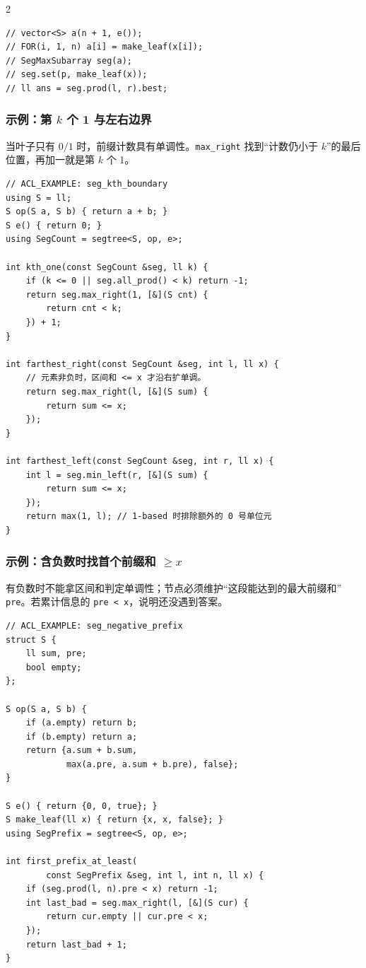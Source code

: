 \begin{multicols*}{2}
\begin{verbatim}
// vector<S> a(n + 1, e());
// FOR(i, 1, n) a[i] = make_leaf(x[i]);
// SegMaxSubarray seg(a);
// seg.set(p, make_leaf(x));
// ll ans = seg.prod(l, r).best;
			\end{verbatim}

			\subsubsection{示例：第 $k$ 个 1 与左右边界}

			当叶子只有 $0/1$ 时，前缀计数具有单调性。\texttt{max\_right} 找到“计数仍小于 $k$”的最后位置，再加一就是第 $k$ 个 1。

			\begin{verbatim}
// ACL_EXAMPLE: seg_kth_boundary
using S = ll;
S op(S a, S b) { return a + b; }
S e() { return 0; }
using SegCount = segtree<S, op, e>;

int kth_one(const SegCount &seg, ll k) {
    if (k <= 0 || seg.all_prod() < k) return -1;
    return seg.max_right(1, [&](S cnt) {
        return cnt < k;
    }) + 1;
}

int farthest_right(const SegCount &seg, int l, ll x) {
    // 元素非负时，区间和 <= x 才沿右扩单调。
    return seg.max_right(l, [&](S sum) {
        return sum <= x;
    });
}

int farthest_left(const SegCount &seg, int r, ll x) {
    int l = seg.min_left(r, [&](S sum) {
        return sum <= x;
    });
    return max(1, l); // 1-based 时排除额外的 0 号单位元
}
			\end{verbatim}

			\subsubsection{示例：含负数时找首个前缀和 $\ge x$}

			有负数时不能拿区间和判定单调性；节点必须维护“这段能达到的最大前缀和” \texttt{pre}。若累计信息的 \texttt{pre < x}，说明还没遇到答案。

			\begin{verbatim}
// ACL_EXAMPLE: seg_negative_prefix
struct S {
    ll sum, pre;
    bool empty;
};

S op(S a, S b) {
    if (a.empty) return b;
    if (b.empty) return a;
    return {a.sum + b.sum,
            max(a.pre, a.sum + b.pre), false};
}

S e() { return {0, 0, true}; }
S make_leaf(ll x) { return {x, x, false}; }
using SegPrefix = segtree<S, op, e>;

int first_prefix_at_least(
        const SegPrefix &seg, int l, int n, ll x) {
    if (seg.prod(l, n).pre < x) return -1;
    int last_bad = seg.max_right(l, [&](S cur) {
        return cur.empty || cur.pre < x;
    });
    return last_bad + 1;
}
			\end{verbatim}

		\end{multicols*}
